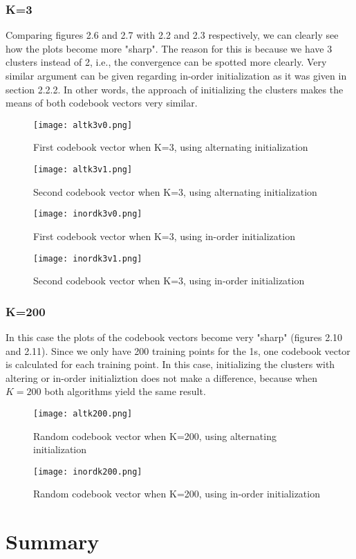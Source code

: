 \documentclass[a4paper, 11pt]{report}
\begin{document}
\subsection{K=3}
Comparing figures 2.6 and 2.7 with 2.2 and 2.3 respectively, we can clearly see how the plots become more "sharp". The reason for this is because we have 3 clusters instead of 2, i.e., the convergence can be spotted more clearly. Very similar argument can be given regarding in-order initialization as it was given in section 2.2.2. In other words, the approach of initializing the clusters makes the means of both codebook vectors very similar.
\begin{figure}[H]
    \texttt{[image: altk3v0.png]}
    \caption{First codebook vector when K=3, using alternating initialization}
    \texttt{[image: altk3v1.png]}
    \caption{Second codebook vector when K=3, using alternating initialization}
\end{figure}
\begin{figure}[H]
    \texttt{[image: inordk3v0.png]}
    \caption{First codebook vector when K=3, using in-order initialization}
    \texttt{[image: inordk3v1.png]}
    \caption{Second codebook vector when K=3, using in-order initialization}
\end{figure}

\subsection{K=200}
In this case the plots of the codebook vectors become very "sharp" (figures 2.10 and 2.11). Since we only have 200 training points for the 1s, one codebook vector is calculated for each training point. In this case, initializing the clusters with altering or in-order initializtion does not make a difference, because when $K=200$ both algorithms yield the same result. 
\begin{figure}[H]
    \texttt{[image: altk200.png]}
    \caption{Random codebook vector when K=200, using alternating initialization}
    \texttt{[image: inordk200.png]}
    \caption{Random codebook vector when K=200, using in-order initialization}
\end{figure}

\chapter{Summary}
\end{document}

